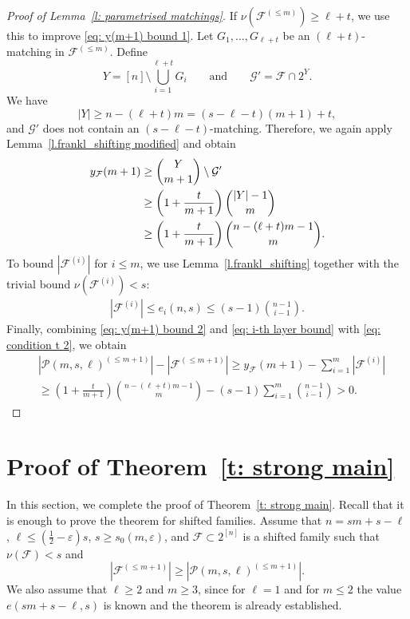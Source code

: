 \documentclass{article}
\begin{document}
\begin{proof}[Proof of Lemma~\ref{l: parametrised matchings}]
If $\nu(\mathcal{F}^{(\leq m)}) \geq \ell + t$, we use this to improve \eqref{eq: y(m+1) bound 1}. Let $G_1, \ldots, G_{\ell+t}$ be an $(\ell+t)$-matching in $\mathcal{F}^{(\leq m)}$. Define
\[
Y = [n] \setminus \bigcup_{i=1}^{\ell+t}G_i
\qquad\text{and}\qquad
\mathcal{G}' = \mathcal{F} \cap 2^{Y}.
\]
We have
\[
|Y| \geq n - (\ell+t)m = (s-\ell-t)(m + 1)+t,
\]
and $\mathcal{G}'$ does not contain an $(s-\ell-t)$-matching. Therefore, we again apply Lemma~\ref{l.frankl_shifting modified} and obtain
\begin{align}
    y_{\mathcal{F}}(m+1) \notag
    &\geq {Y\choose m+1}\setminus \mathcal{G}' \\
    \label{eq: y(m+1) bound 2}
    &\geq \left(1 + \frac{t}{m+1}\right){|Y| - 1 \choose m} \\
    \notag
    &\geq \left(1 + \frac{t}{m+1}\right){n - (\ell+t)m - 1 \choose m}.
\end{align}
To bound $|\mathcal{F}^{(i)}|$ for $i \leq m$, we use Lemma~\ref{l.frankl_shifting} together with the trivial bound $\nu(\mathcal{F}^{(i)}) < s$:
\begin{align} \label{eq: i-th layer bound}
    |\mathcal{F}^{(i)}| \leq e_{i}(n, s) \leq (s-1){n-1 \choose i - 1}.
\end{align}
Finally, combining \eqref{eq: y(m+1) bound 2} and \eqref{eq: i-th layer bound} with \eqref{eq: condition t 2}, we obtain
\begin{align*}
    &|\mathcal{P}(m, s, \ell)^{(\leq m+1)}| - |\mathcal{F}^{(\leq m+1)}| \geq y_{\mathcal{F}}(m+1) - \sum_{i=1}^{m}|\mathcal{F}^{(i)}| \\
    &\geq \left(1 + \frac{t}{m+1}\right){n - (\ell+t)m - 1 \choose m} - (s-1)\sum_{i=1}^{m}{n-1 \choose i - 1} > 0.
\end{align*}
\end{proof}

\section{Proof of Theorem~\ref{t: strong main}} \label{s: completing proof}

In this section, we complete the proof of Theorem~\ref{t: strong main}. Recall that it is enough to prove the theorem for shifted families. Assume that $n = sm + s-\ell$, $\ell \leq \left(\frac{1}{2} - \varepsilon\right)s$, $s \geq s_0(m, \varepsilon)$, and $\mathcal{F} \subset 2^{[n]}$ is a shifted family such that $\nu(\mathcal{F}) < s$ and
\[
|\mathcal{F}^{(\leq m + 1)}| \geq |\mathcal{P}(m, s, \ell)^{(\leq m+1)}|.
\]
We also assume that $\ell \geq 2$ and $m \geq 3$, since for $\ell = 1$ \cite{Kl} and for $m \leq 2$ \cite{KS} the value $e(sm+s-\ell, s)$ is known and the theorem is already established.
\end{document}
